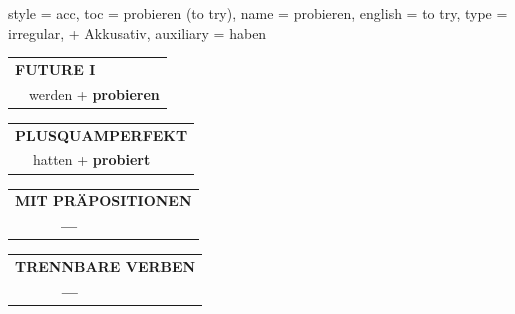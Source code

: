 \begin{verbentry}{
  style = {acc},
  toc = {probieren (to try)},
  name = {probieren},
  english = {to try},
  type = {irregular, + Akkusativ},
  auxiliary = {haben}
}
\begin{tabular}{rl}
    \multicolumn{2}{l}{\textbf{FUTURE I} }\\
   & werden + \textbf{probieren}\\
 
  \end{tabular}
\hfill
   \begin{tabular}{rl}
      \multicolumn{2}{l}{\textbf{PLUSQUAMPERFEKT}}\\
   & hatten + \textbf{probiert}\\
  \end{tabular}
  
  
\vspace{10pt}

\begin{tabular}{lll}
\multicolumn{3}{l}{\textbf{MIT PRÄPOSITIONEN}}\\
& \textbf{---} & \\
\end{tabular}
\hfill
\begin{tabular}{lll}
\multicolumn{3}{l}{\textbf{TRENNBARE VERBEN}}\\
& \textbf{---} & \\
\end{tabular}
\vspace{-5pt}
\end{verbentry}

